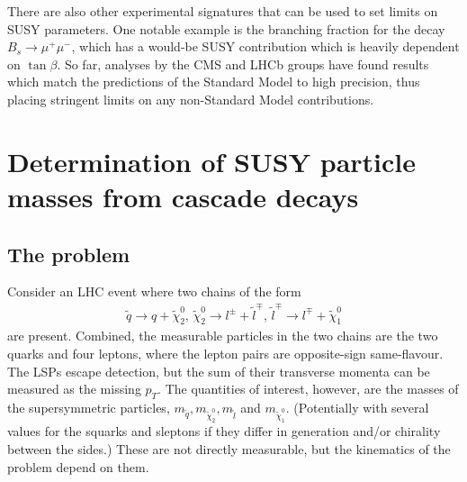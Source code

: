 \documentclass[twoside,english]{uiofysmaster}
\begin{document}
There are also other experimental signatures that can be used to set limits on SUSY parameters. One notable example is the branching fraction for the decay $B_s \to \mu^+ \mu^-$, which has a would-be SUSY contribution which is heavily dependent on $\tan\beta$. So far, analyses by the CMS and LHCb groups \cite{CMS:2014xfa} have found results which match the predictions of the Standard Model to high precision, thus placing stringent limits on any non-Standard Model contributions. 


















\chapter{Determination of SUSY particle masses from cascade decays}%
\label{ch:introducing_the_method}




\section{The problem}
Consider an LHC event where two chains of the form
\begin{align}
	\tilde{q} \to q + \tilde{\chi}_2^0, \, \tilde{\chi}_2^0 \to l^{\pm} + \tilde{l}^\mp, \, \tilde{l}^\mp \to l^\mp + \tilde{\chi}_1^0\label{eq:goldencascade}
\end{align}
are present. Combined, the measurable particles in the two chains are the two quarks and four leptons, where the lepton pairs are opposite-sign same-flavour. The LSPs escape detection, but the sum of their transverse momenta can be measured as the missing $p_T$. The quantities of interest, however, are the masses of the supersymmetric particles, $m_{\tilde{q}}, m_{\tilde{\chi}_2^0}, m_{\tilde{l}}$ and $m_{\tilde{\chi}_1^0}$. (Potentially with several values for the squarks and sleptons if they differ in generation and/or chirality between the sides.) These are not directly measurable, but the kinematics of the problem depend on them. 
\end{document}
